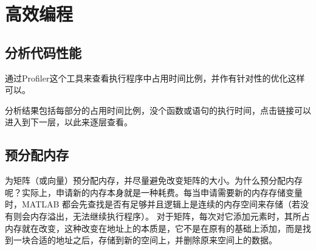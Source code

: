 \section{高效编程}

\subsection{分析代码性能}

通过Profiler这个工具来查看执行程序中占用时间比例，并作有针对性的优化这样可以。

\vspace{-0.8cm}


分析结果包括每部分的占用时间比例，没个函数或语句的执行时间，点击链接可以进入到下一层，以此来逐层查看。







\subsection{预分配内存}

为矩阵（或向量）预分配内存，并尽量避免改变矩阵的大小。为什么预分配内存呢？实际上，申请新的内存本身就是一种耗费。每当申请需要新的内存存储变量时，MATLAB 都会先查找是否有足够并且逻辑上是连续的内存空间来存储（若没有则会内存溢出，无法继续执行程序）。 对于矩阵，每次对它添加元素时，其所占内存就在改变，这种改变在地址上的本质是，它不是在原有的基础上添加，而是找到一块合适的地址之后，存储到新的空间上，并删除原来空间上的数据。

\vspace{-0.8cm}


\vspace{-0.8cm}






